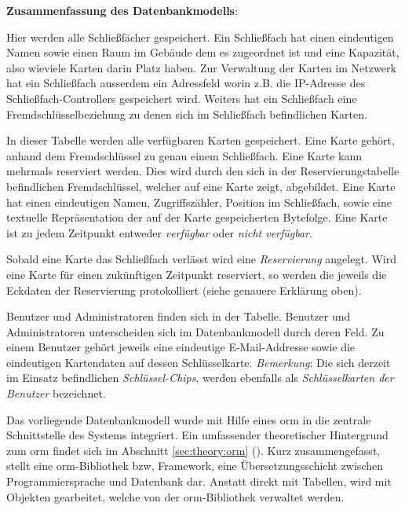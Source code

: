 \newpage
\noindent
\textbf{Zusammenfassung des Datenbankmodells}:
\begin{description}\setlength\itemsep{1.5em}

\item[\mono{storages}] Hier werden alle Schließfächer gespeichert. Ein Schließfach hat einen eindeutigen Namen sowie einen Raum im Gebäude dem es zugeordnet ist und eine Kapazität, also wieviele Karten darin Platz haben. Zur Verwaltung der Karten im Netzwerk hat ein Schließfach ausserdem ein \frqq{}Adressfeld\flqq{} worin z.B. die IP-Adresse des Schließfach-Controllers gespeichert wird. Weiters hat ein Schließfach eine Fremdschlüsselbeziehung zu denen sich im Schließfach befindlichen Karten.

\item[\mono{cards}] In dieser Tabelle werden alle verfügbaren Karten gespeichert. Eine Karte gehört, anhand dem  Fremdschlüssel zu genau einem Schließfach. Eine Karte kann mehrmals reserviert werden. Dies wird durch den sich in der Reservierungstabelle befindlichen Fremdschlüssel, welcher auf eine Karte zeigt, abgebildet. Eine Karte hat einen eindeutigen Namen, Zugriffszähler, Position im Schließfach, sowie eine textuelle Repräsentation der auf der Karte gespeicherten Bytefolge. Eine Karte ist zu jedem Zeitpunkt entweder \textit{verfügbar} oder \textit{nicht verfügbar}.   

\item[\mono{reservations}] Sobald eine Karte das Schließfach verlässt wird eine \textit{Reservierung} angelegt. Wird eine Karte für einen zukünftigen Zeitpunkt reserviert, so werden die jeweils die Eckdaten der Reservierung protokolliert (siehe genauere Erklärung oben). 

\item[\mono{users}] Benutzer und Administratoren finden sich in der  Tabelle. Benutzer und Administratoren unterscheiden sich im Datenbankmodell durch deren  Feld. Zu einem Benutzer gehört jeweils eine eindeutige E-Mail-Addresse sowie die eindeutigen Kartendaten auf dessen Schlüsselkarte. \textit{Bemerkung}: Die sich derzeit im Einsatz befindlichen \textit{Schlüssel-Chips}, werden ebenfalls als \frqq{}\textit{Schlüsselkarten der Benutzer}\flqq{} bezeichnet.  
\end{description}

\newpage\vfill
\begin{center}    
    \makebox[\textwidth][c]{}
    \label{fig:dbschema}
\end{center}
\newpage
\noindent
Das vorliegende Datenbankmodell wurde mit Hilfe eines \acrlong{orm} in die zentrale Schnittstelle des Systems integriert. Ein umfassender theoretischer Hintergrund zum \acrlong{orm} findet sich im Abschnitt \ref{sec:theory:orm} (). Kurz zusammengefasst, stellt eine \acrshort{orm}-Bibliothek bzw, Framework, eine Übersetzungsschicht zwischen Programmiersprache und Datenbank dar. Anstatt direkt mit Tabellen, wird mit Objekten gearbeitet, welche von der \acrshort{orm}-Bibliothek verwaltet werden. \bigskip

